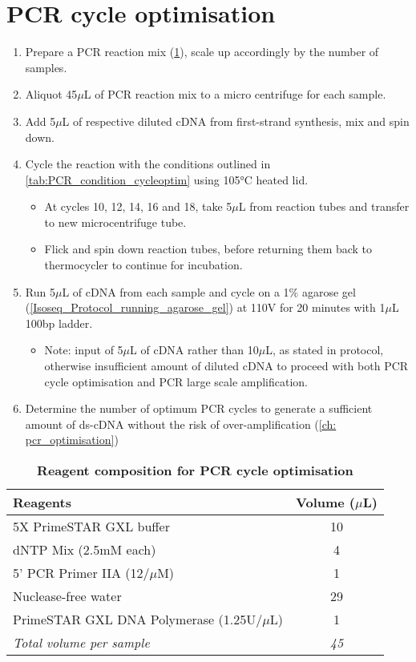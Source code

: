 \clearpage
\section{PCR cycle optimisation} 
\label{proto: pcr_cycle}
\begin{enumerate}
	\item Prepare a PCR reaction mix (\cref{tab:pcr_synthesis}), scale up accordingly by the number of samples.
	\item Aliquot 45$\mu$L of PCR reaction mix to a micro centrifuge for each sample. 
	\item Add 5$\mu$L of respective diluted cDNA from first-strand synthesis, mix and spin down. 
	\item Cycle the reaction with the conditions outlined in \cref{tab:PCR_condition_cycleoptim} using 105°C heated lid.
	\begin{itemize}
		\item At cycles 10, 12, 14, 16 and 18, take 5$\mu$L from reaction tubes and transfer to new microcentrifuge tube.
		\item Flick and spin down reaction tubes, before returning them back to thermocycler to continue for incubation.  
	\end{itemize}
	\item Run 5$\mu$L of cDNA from each sample and cycle on a 1\% agarose gel (\cref{Isoseq_Protocol_running_agarose_gel}) at 110V for 20 minutes with 1$\mu$L 100bp ladder.
	\begin{itemize}
		\item Note: input of 5$\mu$L of cDNA rather than 10$\mu$L, as stated in protocol, otherwise insufficient amount of diluted cDNA to proceed with both PCR cycle optimisation and PCR large scale amplification.
	\end{itemize} 
	\item Determine the number of optimum PCR cycles to generate a sufficient amount of ds-cDNA without the risk of over-amplification (\cref{ch: pcr_optimisation})
\end{enumerate} 

\vspace{1cm}
\begin{table}[h]
	\centering
	\caption[Reagent composition for PCR cycle optimisation]%
	{\textbf{Reagent composition for PCR cycle optimisation}}
	\label{tab:pcr_synthesis}
	\begin{tabularx}{0.8\textwidth}{lc}
		\toprule 
		Reagents                         & Volume ($\mu$L) \\ \midrule
		5X PrimeSTAR GXL buffer          & 10          \\ 
		dNTP Mix (2.5mM each)            & 4           \\ 
		5' PCR Primer IIA (12/$\mu$M)     & 1           \\ 
		Nuclease-free water              & 29          \\ 
		PrimeSTAR GXL DNA Polymerase (1.25U/$\mu$L) & 1       \\ 
		\textit{Total volume per sample}          & \textit{45}          \\ 
		\bottomrule	
	\end{tabularx}
\end{table}

